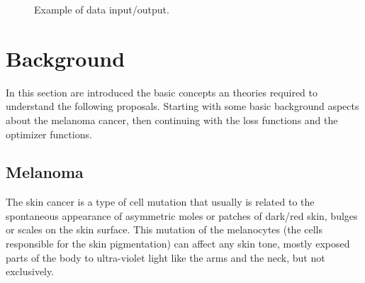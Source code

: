 \begin{figure}[h]
  \centering
  \qquad
  \caption{Example of data input/output.}
\end{figure}


\section{Background}
In this section are introduced the basic concepts an theories required to understand the following proposals. Starting with some basic background aspects about the melanoma cancer, then continuing with the loss functions and the optimizer functions.

\subsection{Melanoma}
The skin cancer is a type of cell mutation that usually is related to the spontaneous appearance of asymmetric moles or patches of dark/red skin, bulges or scales on the skin surface. This mutation of the melanocytes (the cells responsible for the skin pigmentation) can affect any skin tone, mostly exposed parts of the body to ultra-violet light like the arms and the neck, but not exclusively.

